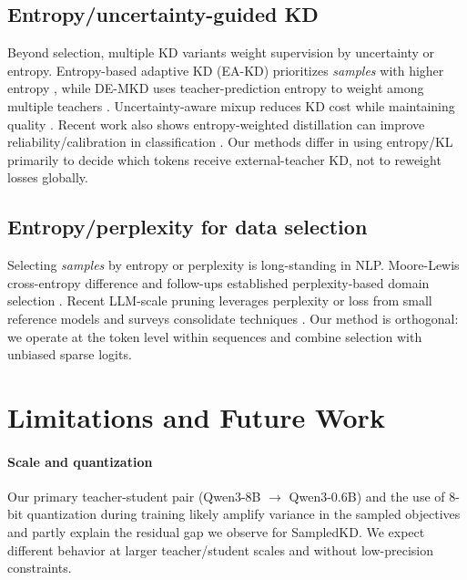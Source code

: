 \documentclass[11pt]{article}
\begin{document}
\subsection{Entropy/uncertainty-guided KD} Beyond selection, multiple KD variants weight supervision by uncertainty or entropy.
Entropy-based adaptive KD (EA-KD) prioritizes \emph{samples} with higher entropy \citep{su2023eakd}, while DE-MKD uses teacher-prediction entropy to weight among multiple teachers \citep{cheng2024demkd}.
Uncertainty-aware mixup reduces KD cost while maintaining quality \citep{xu2023unix}.
Recent work also shows entropy-weighted distillation can improve reliability/calibration in classification \citep{guo2024entropykd}.
Our methods differ in using entropy/KL primarily to decide which tokens receive external-teacher KD, not to reweight losses globally.


\subsection{Entropy/perplexity for data selection} Selecting \emph{samples} by entropy or perplexity is long-standing in NLP.
Moore-Lewis cross-entropy difference and follow-ups established perplexity-based domain selection \citep{moore2010cediff,axelrod2015few,axelrod2017cynical}.
Recent LLM-scale pruning leverages perplexity or loss from small reference models \citep{ankner2024perplexedperplexityperplexitybaseddata} and surveys consolidate techniques \citep{datasel2024survey}.
Our method is orthogonal: we operate at the token level within sequences and combine selection with unbiased sparse logits.

\section{Limitations and Future Work}
\label{sec:limits}
\paragraph{Scale and quantization}
Our primary teacher-student pair (Qwen3-8B $\rightarrow$ Qwen3-0.6B) and the use of 8-bit quantization during training likely amplify variance in the sampled objectives and partly explain the residual gap we observe for SampledKD.
We expect different behavior at larger teacher/student scales and without low-precision constraints.
\end{document}
